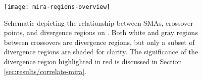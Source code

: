 \begin{figure}
    \centering
    \texttt{[image: mira-regions-overview]}
    \vspace{-.15in}
    \caption{Schematic depicting the relationship between SMAs, crossover points, and divergence regions on \mira.
    Both white and gray regions between crossovers are divergence regions, but only a subset of divergence regions are shaded for clarity.
    The significance of the divergence region highlighted in red is discussed in Section \ref{sec:results/correlate-mira}.}
    \label{fig:mira-regions-overview}
    \vspace{-.15in}
\end{figure}
